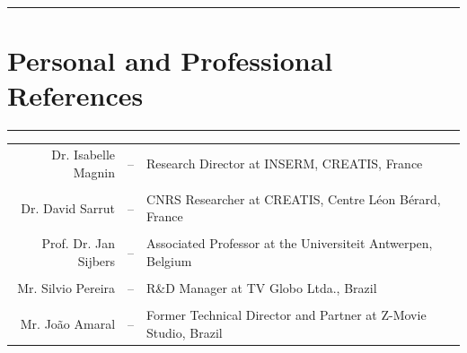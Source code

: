 \documentclass[a4paper]{article}
\begin{document}



\pagebreak

\medskip
\medskip

\hrule
\section{Personal and Professional References}
\hrule

\medskip
\medskip

\medskip
\medskip

\begin{center}
\begin{tabular}{r c l}
Dr. Isabelle Magnin & -- & Research Director at INSERM, CREATIS, France\\
\\
Dr. David Sarrut & -- & CNRS Researcher at CREATIS, Centre L\'eon B\'erard, France\\
\\
Prof. Dr. Jan Sijbers & -- & Associated Professor at the Universiteit Antwerpen, Belgium \\
\\
Mr. Silvio Pereira & -- & R\&D Manager at TV Globo Ltda., Brazil \\
\\
Mr. Jo\~ao Amaral & -- & Former Technical Director and Partner at Z-Movie Studio, Brazil \\
\end{tabular}
\end{center}
\vfill





\end{document}
